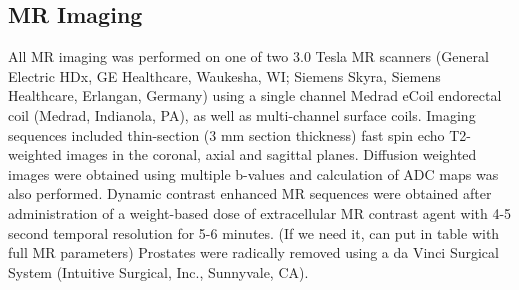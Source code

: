\subsection{MR Imaging}
All MR imaging was performed on one of two 3.0 Tesla MR scanners (General
Electric HDx, GE Healthcare, Waukesha, WI;  Siemens Skyra, Siemens Healthcare,
Erlangan, Germany) using a single channel Medrad eCoil endorectal coil (Medrad,
Indianola, PA), as well as multi-channel surface coils.  Imaging sequences
included thin-section (3 mm section thickness) fast spin echo T2-weighted
images in the coronal, axial and sagittal planes.  Diffusion weighted images
were obtained using multiple b-values and calculation of ADC maps was also
performed.  Dynamic contrast enhanced MR sequences were obtained after
administration of a weight-based dose of extracellular MR contrast agent with
4-5 second temporal resolution for 5-6 minutes. (If we need it, can put in
table with full MR parameters) Prostates were radically removed using a da
Vinci Surgical System (Intuitive Surgical\textregistered, Inc., Sunnyvale, CA).
